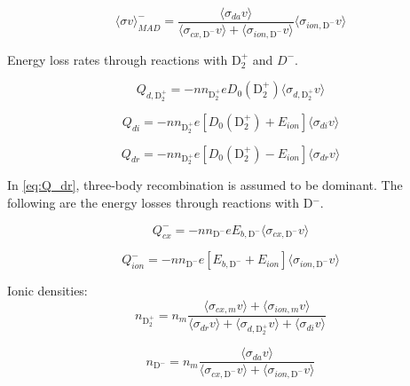 \documentclass[amsmath,amssymb,a4]{revtex4-2}
\begin{document}
\begin{equation}
    \langle\sigma v\rangle_{MAD}^- = \frac{\langle\sigma_{da} v\rangle}{  \langle \sigma_{cx,\mathrm{D}^-} v\rangle  +  \langle \sigma_{ion,\mathrm{D}^-} v\rangle}\langle \sigma_{ion,\mathrm{D}^-} v\rangle
\end{equation}

Energy loss rates through reactions with D$_2^+$ and $D^-$. 

\begin{equation}
    Q_{d,\mathrm{D}_2^+} = -nn_{\mathrm{D_2^+}}eD_0(\mathrm{D}_2^+)\langle\sigma_{d,\mathrm{D}_2^+}v\rangle
\end{equation}

\begin{equation}
    Q_{di} = -nn_{\mathrm{D_2^+}}e\left[D_0(\mathrm{D}_2^+)+E_{ion}\right]\langle\sigma_{di}v\rangle
\end{equation}

\begin{equation}
    Q_{dr} = -nn_{\mathrm{D_2^+}}e\left[D_0(\mathrm{D}_2^+)-E_{ion}\right]\langle\sigma_{dr}v\rangle
    \label{eq:Q_dr}
\end{equation}

In \eqref{eq:Q_dr}, three-body recombination is assumed to be dominant. The following are the energy losses through reactions with D$^-$. 

\begin{equation}
    Q_{cx}^- = -nn_{\mathrm{D}^-}eE_{b,\mathrm{D}^-}\langle\sigma_{cx, \mathrm{D}^-}v\rangle
    \label{eq:Qcxmin}
\end{equation}

\begin{equation}
    Q_{ion}^- = -nn_{\mathrm{D}^-}e\left[E_{b,\mathrm{D}^-} + E_{ion}\right]\langle\sigma_{ion, \mathrm{D}^-}v\rangle
    \label{eq:Qionmin}
\end{equation}

Ionic densities: 
\begin{equation}
    n_{\mathrm{D}_2^+} = n_m  \frac{\langle\sigma_{cx,m} v\rangle +  \langle\sigma_{ion,m} v\rangle}{ \langle\sigma_{dr} v\rangle +  \langle\sigma_{d,\mathrm{D}_2^+} v\rangle  +  \langle\sigma_{di} v\rangle }
\end{equation}

\begin{equation}
    n_{\mathrm{D}^-} = n_m \frac{\langle\sigma_{da} v\rangle}{  \langle \sigma_{cx,\mathrm{D}^-} v\rangle  +  \langle \sigma_{ion,\mathrm{D}^-} v\rangle}
\end{equation}
\end{document}
